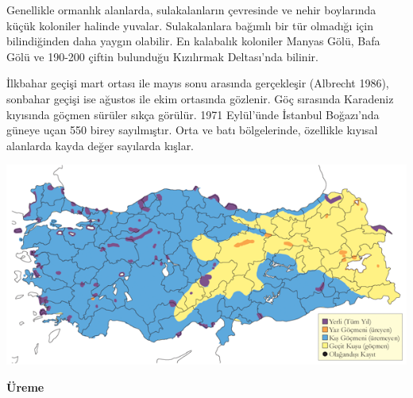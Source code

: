 \documentclass[
  letterpaper,
  DIV=11,
  numbers=noendperiod]{scrreprt}
\begin{document}
Genellikle ormanlık alanlarda, sulakalanların çevresinde ve nehir
boylarında küçük koloniler halinde yuvalar. Sulakalanlara bağımlı bir
tür olmadığı için bilindiğinden daha yaygın olabilir. En kalabalık
koloniler Manyas Gölü, Bafa Gölü ve 190-200 çiftin bulunduğu Kızılırmak
Deltası'nda bilinir.

İlkbahar geçişi mart ortası ile mayıs sonu arasında gerçekleşir
(Albrecht 1986), sonbahar geçişi ise ağustos ile ekim ortasında
gözlenir. Göç sırasında Karadeniz kıyısında göçmen sürüler sıkça
görülür. 1971 Eylül'ünde İstanbul Boğazı'nda güneye uçan 550 birey
sayılmıştır. Orta ve batı bölgelerinde, özellikle kıyısal alanlarda
kayda değer sayılarda kışlar.

\includegraphics{images/harita_Page_069.png}

\textbf{Üreme}
\end{document}
